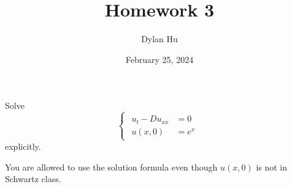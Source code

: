 \documentclass[plain]{pset}
\title{Homework 3}
\author{Dylan Hu}
\date{February 25, 2024}
\begin{document}
\begin{multicols}{2}
    \raggedcolumns{}
    \maketitle
    \columnbreak{}
    \tableofcontents
\end{multicols}

\setlength{\parskip}{1em}

\pagebreak

\begin{problem}
Solve
\[\begin{cases}\begin{aligned}
            u_t - Du_{xx} & = 0   \\
            u(x, 0)       & = e^x
        \end{aligned}\end{cases}\]
explicitly.
\begin{remark*}
    You are allowed to use the solution formula even though \(u(x, 0)\) is not in Schwartz class.
\end{remark*}
\end{problem}
\end{document}
